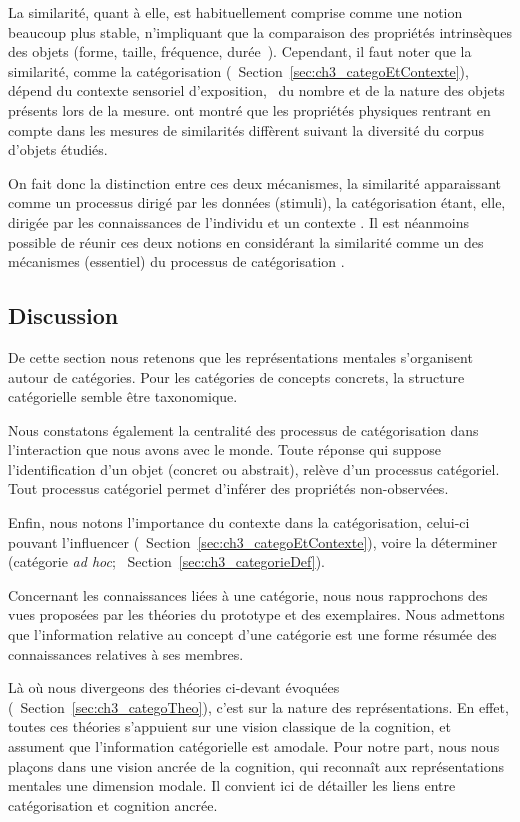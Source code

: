 La similarité, quant à elle, est habituellement comprise comme une notion beaucoup plus stable, n'impliquant que la comparaison des propriétés intrinsèques des objets (forme, taille, fréquence, durée~\etc). Cependant, il faut noter que la similarité, comme la catégorisation (\cf~Section~\ref{sec:ch3_categoEtContexte}), dépend du contexte sensoriel d'exposition, \ie~du nombre et de la nature des objets présents lors de la mesure. \citep{tversky1977features,tversky1978studies} ont montré que les propriétés physiques rentrant en compte dans les mesures de similarités diffèrent suivant la diversité du corpus d'objets étudiés.

On fait donc la distinction entre ces deux mécanismes, la similarité apparaissant comme un processus dirigé par les données (stimuli), la catégorisation étant, elle, dirigée par les connaissances de l'individu et un contexte \citep[p. 59]{Houix03f}. Il est néanmoins possible de réunir ces deux notions en considérant la similarité comme un des mécanismes (essentiel) du processus de catégorisation \citep[p. 61-65]{Houix03f}. 

\subsection{Discussion}

De cette section nous retenons que les représentations mentales s'organisent autour de catégories. Pour les catégories de concepts concrets, la structure catégorielle semble être taxonomique.

Nous constatons également la centralité des processus de catégorisation dans l'interaction que nous avons avec le monde. Toute réponse qui suppose l'identification d'un objet (concret ou abstrait), relève d'un processus catégoriel. Tout processus catégoriel permet d'inférer des propriétés non-observées.

Enfin, nous notons l'importance du contexte dans la catégorisation, celui-ci pouvant l'influencer (\cf~Section~\ref{sec:ch3_categoEtContexte}), voire la déterminer (catégorie \emph{ad hoc}; \cf~Section~\ref{sec:ch3_categorieDef}).

Concernant les connaissances liées à une catégorie, nous nous rapprochons des vues proposées par les théories du prototype et des exemplaires. Nous admettons que l'information relative au concept d'une catégorie est une forme résumée des connaissances relatives à ses membres.

Là où nous divergeons des théories ci-devant évoquées (\cf~Section~\ref{sec:ch3_categoTheo}), c'est sur la nature des représentations. En effet, toutes ces théories s'appuient sur une vision classique de la cognition, et assument que l'information catégorielle est amodale. Pour notre part, nous nous plaçons dans une vision ancrée de la cognition, qui reconnaît aux représentations mentales une dimension modale. Il convient ici de détailler les liens entre catégorisation et cognition ancrée.

